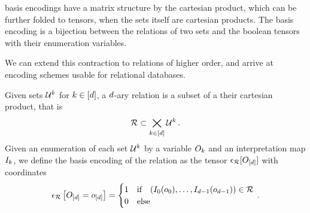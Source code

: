 basis encodings have a matrix structure by the cartesian product, which can be further folded to tensors, when the sets itself are cartesian products.
The basis encoding is a bijection between the relations of two sets and the boolean tensors with their enumeration variables.

%




We can extend this contraction to relations of higher order, and arrive at encoding schemes usable for relational databases.

\begin{definition}
    \label{def:daryRelation}
    Given sets $\mathcal{U}^{k}$ for $k\in[d]$, a $d$-ary relation is a subset of a their cartesian product, that is
    \begin{align*}
        \mathcal{R} \subset\bigtimes_{k\in[d]} \mathcal{U}^{k} \, .
    \end{align*}
    Given an enumeration of each set $\mathcal{U}^{k}$ by a variable $O_{k}$ and an interpretation map $I_{k}$, we define the basis encoding of the relation as the tensor $\epsilon_{\mathcal{R}}[O_{[d]}]$ with coordinates
    \begin{align*}
        \epsilon_{\mathcal{R}}\left[O_{[d]}=o_{[d]}\right]
        = \begin{cases}
              1 & \text{if}\quad (I_{0}(o_{0}),\ldots,I_{d-1}(o_{d-1})) \in \mathcal{R} \\
              0 & \text{else}
        \end{cases} \, .
    \end{align*}
\end{definition}

